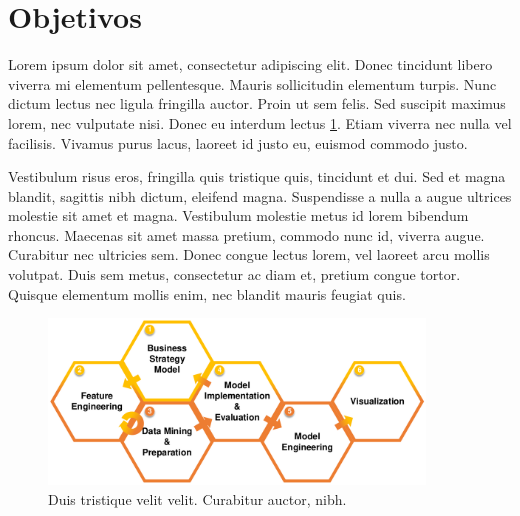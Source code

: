 \section{Objetivos}\label{sec:objetivos}
Lorem ipsum dolor sit amet, consectetur adipiscing elit. Donec tincidunt libero viverra mi elementum pellentesque. Mauris sollicitudin elementum turpis. Nunc dictum lectus nec ligula fringilla auctor. Proin ut sem felis. Sed suscipit maximus lorem, nec vulputate nisi. Donec eu interdum lectus \ref{fig:figure1}. Etiam viverra nec nulla vel facilisis. Vivamus purus lacus, laoreet id justo eu, euismod commodo justo.\par

Vestibulum risus eros, fringilla quis tristique quis, tincidunt et dui. Sed et magna blandit, sagittis nibh dictum, eleifend magna. Suspendisse a nulla a augue ultrices molestie sit amet et magna. Vestibulum molestie metus id lorem bibendum rhoncus. Maecenas sit amet massa pretium, commodo nunc id, viverra augue. Curabitur nec ultricies sem. Donec congue lectus lorem, vel laoreet arcu mollis volutpat. Duis sem metus, consectetur ac diam et, pretium congue tortor. Quisque elementum mollis enim, nec blandit mauris feugiat quis.\par

\begin{figure}[h]
    \centering
    \captionsetup{width=10cm}
    \includegraphics[width=10cm]{contenido/imagenes/DDSD.pdf}
    \caption{Duis tristique velit velit. Curabitur auctor, nibh.}
    \label{fig:figure1}
\end{figure}

